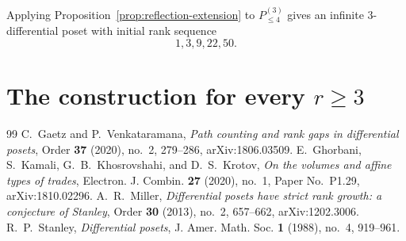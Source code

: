 \documentclass[10pt,a4paper]{amsart}
\begin{document}
Applying Proposition~\ref{prop:reflection-extension} to $P^{(3)}_{\leq4}$ gives an infinite $3$-differential poset with initial rank sequence
\[
  1,3,9,22,50.
\]

\section{The construction for every \texorpdfstring{$r\geq3$}{r >= 3}}\label{sec:general-r}

\begin{thebibliography}{99}
 C.~Gaetz and P.~Venkataramana, \emph{Path counting and rank gaps in differential posets}, Order \textbf{37} (2020), no.~2, 279--286, arXiv:1806.03509.
 E.~Ghorbani, S.~Kamali, G.~B.~Khosrovshahi, and D.~S.~Krotov, \emph{On the volumes and affine types of trades}, Electron. J. Combin. \textbf{27} (2020), no.~1, Paper No.~P1.29, arXiv:1810.02296.
 A.~R.~Miller, \emph{Differential posets have strict rank growth: a conjecture of Stanley}, Order \textbf{30} (2013), no.~2, 657--662, arXiv:1202.3006.
 R.~P.~Stanley, \emph{Differential posets}, J. Amer. Math. Soc. \textbf{1} (1988), no.~4, 919--961.
\end{thebibliography}
\end{document}
